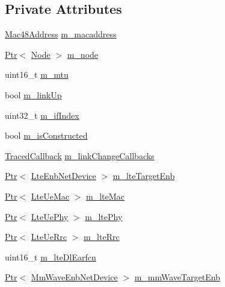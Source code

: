 \subsection*{Private Attributes}
\begin{DoxyCompactItemize}
\item 
\hyperlink{classns3_1_1Mac48Address}{Mac48\+Address} \hyperlink{classns3_1_1McUeNetDevice_ad519c434db61207cbfccf870c98ef3bc}{m\+\_\+macaddress}
\item 
\hyperlink{classns3_1_1Ptr}{Ptr}$<$ \hyperlink{classns3_1_1Node}{Node} $>$ \hyperlink{classns3_1_1McUeNetDevice_a322725b9dad6b9f01eebe9f2b23fc6f6}{m\+\_\+node}
\item 
uint16\+\_\+t \hyperlink{classns3_1_1McUeNetDevice_af659ad668745946f9c003d473f4327e3}{m\+\_\+mtu}
\item 
bool \hyperlink{classns3_1_1McUeNetDevice_aa7927c08ae8a08a2aab3ecfbef8afd9a}{m\+\_\+link\+Up}
\item 
uint32\+\_\+t \hyperlink{classns3_1_1McUeNetDevice_ae4d1fac4c9220bd40117d4eb426d7319}{m\+\_\+if\+Index}
\item 
bool \hyperlink{classns3_1_1McUeNetDevice_a279015f246fd2390546e86534c58af98}{m\+\_\+is\+Constructed}
\item 
\hyperlink{classns3_1_1TracedCallback}{Traced\+Callback} \hyperlink{classns3_1_1McUeNetDevice_ad3226d31c2f1e64508728ffb5bbb53fc}{m\+\_\+link\+Change\+Callbacks}
\item 
\hyperlink{classns3_1_1Ptr}{Ptr}$<$ \hyperlink{classns3_1_1LteEnbNetDevice}{Lte\+Enb\+Net\+Device} $>$ \hyperlink{classns3_1_1McUeNetDevice_af356308a68332afec53c00d213c3b20a}{m\+\_\+lte\+Target\+Enb}
\item 
\hyperlink{classns3_1_1Ptr}{Ptr}$<$ \hyperlink{classns3_1_1LteUeMac}{Lte\+Ue\+Mac} $>$ \hyperlink{classns3_1_1McUeNetDevice_ae4f49b8ba86613c84fd16176762c653c}{m\+\_\+lte\+Mac}
\item 
\hyperlink{classns3_1_1Ptr}{Ptr}$<$ \hyperlink{classns3_1_1LteUePhy}{Lte\+Ue\+Phy} $>$ \hyperlink{classns3_1_1McUeNetDevice_a740afd04e5cbf2fdde0de8877a463069}{m\+\_\+lte\+Phy}
\item 
\hyperlink{classns3_1_1Ptr}{Ptr}$<$ \hyperlink{classns3_1_1LteUeRrc}{Lte\+Ue\+Rrc} $>$ \hyperlink{classns3_1_1McUeNetDevice_aac81a393e1f9101f016915c957e91d97}{m\+\_\+lte\+Rrc}
\item 
uint16\+\_\+t \hyperlink{classns3_1_1McUeNetDevice_a4bb5a2ec27fabb4f61dbcd1fe0a4642f}{m\+\_\+lte\+Dl\+Earfcn}
\item 
\hyperlink{classns3_1_1Ptr}{Ptr}$<$ \hyperlink{classns3_1_1MmWaveEnbNetDevice}{Mm\+Wave\+Enb\+Net\+Device} $>$ \hyperlink{classns3_1_1McUeNetDevice_a395d39a9059ce8f5f0cc6fd7415f9e53}{m\+\_\+mm\+Wave\+Target\+Enb}

\end{DoxyCompactItemize}
